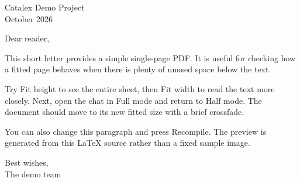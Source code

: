 \documentclass[12pt,letterpaper]{article}
\begin{document}
\begin{flushright}
Catalex Demo Project\\
October 2026
\end{flushright}
\bigskip
\noindent Dear reader,

This short letter provides a simple single-page PDF. It is useful for checking
how a fitted page behaves when there is plenty of unused space below the text.

Try Fit height to see the entire sheet, then Fit width to read the text more
closely. Next, open the chat in Full mode and return to Half mode. The document
should move to its new fitted size with a brief crossfade.

You can also change this paragraph and press Recompile. The preview is generated
from this LaTeX source rather than a fixed sample image.

\bigskip
\noindent Best wishes,\\[1ex]
The demo team
\end{document}
